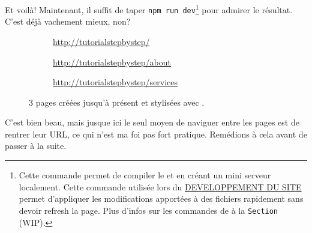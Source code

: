 \newpage

Et voilà! Maintenant, il suffit de taper \verb|npm run dev|\footnote{Cette commande permet de compiler le \css{} et \js{} en créant un mini serveur localement. Cette commande utilisée lors du \underline{DEVELOPPEMENT DU SITE} permet d'appliquer les modifications apportées à des fichiers rapidement sans devoir refresh la page. Plus d'infos sur les commandes de \vite{} à la \texttt{Section~} (WIP).} pour admirer le résultat. C'est déjà vachement mieux, non?

\begin{figure}[!h]
    \begin{subfigure}[c]{0.73\textwidth}
    \end{subfigure}\hfill
    \begin{subfigure}[c]{0.24\textwidth}
        \caption{\url{http://tutorialstepbystep/}} 
    \end{subfigure}
    \begin{subfigure}[c]{0.73\textwidth}
    \end{subfigure}\hfill
    \begin{subfigure}[c]{0.24\textwidth}
        \caption{\url{http://tutorialstepbystep/about}} 
    \end{subfigure}
    \begin{subfigure}[c]{0.73\textwidth}
    \end{subfigure}\hfill
    \begin{subfigure}[c]{0.24\textwidth}
        \caption{\url{http://tutorialstepbystep/services}} 
    \end{subfigure}
    \caption{3 pages créées jusqu'à présent et stylisées avec \bs{}.}
\end{figure}
C'est bien beau, mais jusque ici le seul moyen de naviguer entre les pages est de rentrer leur URL, ce qui n'est ma foi pas fort pratique. Remédions à cela avant de passer à la suite.

